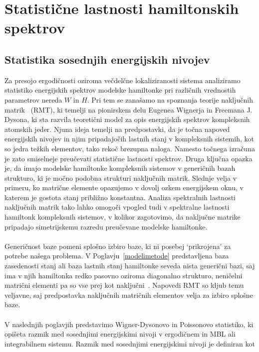 \chapter{Statistične lastnosti hamiltonskih spektrov}
\label{statisticne_lastnosti}
\section{Statistika sosednjih energijskih nivojev}
Za presojo ergodičnosti oziroma večdelčne lokaliziranosti sistema analiziramo statistiko energijskih spektrov modelske hamiltonke pri različnih vrednostih parametrov nereda $W$ in $H$. Pri tem se zanašamo na spoznanja teorije naključnih matrik~\cite{mehta2004random} (RMT), ki temelji na pionirskem delu Eugenea Wignerja in Freemana J. Dysona, ki sta razvila teoretični model za opis energijskih spektrov kompleksnih atomskih jeder. Njuna ideja temelji na predpostavki, da je točna napoved energijskih nivojev in njim pripadajočih lastnih stanj v kompleksnih sistemih, kot so jedra težkih elementov, tako rekoč brezupna naloga. Namesto točnega izračuna je zato smiselneje preučevati statistične lastnosti spektrov. Druga ključna opazka je, da imajo modelske hamiltonke kompleksnih sistemov v generičnih bazah strukturo, ki je močno podobna strukturi naključnih matrik. Slednje velja v primeru, ko matrične elemente opazujemo v dovolj ozkem energijskem oknu, v katerem je gostota stanj približno konstantna. Analiza spektralnih lastnosti naključnih matrik tako lahko omogoči vpogled tudi v spektralne lastnosti hamiltonk kompleksnih sistemov, v kolikor zagotovimo, da naključne matrike pripadajo simetrijskemu razredu preučevane modelske hamiltonke. \\\\
 Generičnost baze pomeni splošno izbiro baze, ki ni posebej `prikrojena' za potrebe našega problema. V Poglavju~\ref{modelimetode} predstavljena baza zasedenosti stanj ali baza lastnih stanj hamiltonke seveda nista generični bazi, saj ima v njih hamiltonka redko pasovno oziroma diagonalno strukturo, neničelni matrični elementi pa so vse prej kot naključni~\cite{d2016quantum}. Napovedi RMT so kljub temu veljavne, saj predpostavka naključnih matričnih elementov velja za izbiro splošne baze. \\\\
 V naslednjih poglavjih predstavimo Wigner-Dysonovo in Poissonovo statistiko, ki opišeta razmik med sosednjimi energijskimi nivoji v ergodičnem in MBL ali integrabilnem sistemu. Razmik med sosednjimi energijskimi nivoji je definiran kot 
